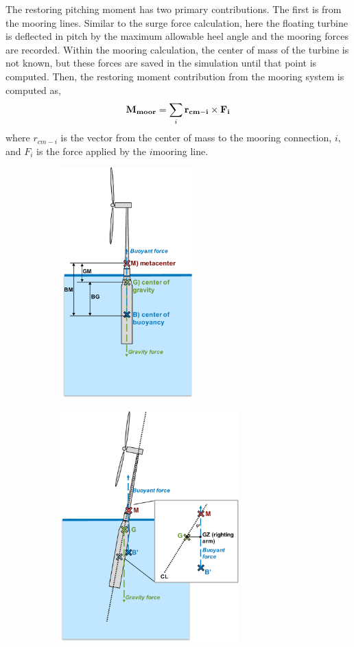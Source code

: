 The restoring pitching moment has two primary contributions.  The first
is from the mooring lines.  Similar to the surge force calculation, here
the floating turbine is deflected in pitch by the maximum allowable heel
angle and the mooring forces are recorded.  Within the mooring
calculation, the center of mass of the turbine is not known, but these
forces are saved in the simulation until that point is computed.  Then,
the restoring moment contribution from the mooring system is computed as,
\[
  \mathbf{M_{moor}} = \sum_i \mathbf{r_{cm-i}} \times \mathbf{F_i}
\]
where $r_{cm-i}$ is the vector from the center of mass to the mooring
connection, $i$, and $F_i$ is the force applied by the $i$\th mooring
line.
\begin{figure}
  \begin{subfigure}[b]{0.49\linewidth}
    \centering \includegraphics[height=3.5in]{figs/metacenterA}
    \caption{}
  \end{subfigure}
  \begin{subfigure}[b]{0.49\linewidth}
    \centering \includegraphics[height=3.5in]{figs/metacenterB}

\end{subfigure}
\end{figure}
